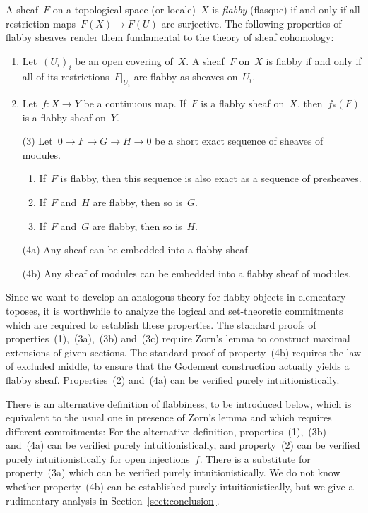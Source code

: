 \documentclass[oneside]{amsart}
\theoremstyle{definition}
\theoremstyle{plain}
\theoremstyle{remark}
\renewcommand{\_}{\mathpunct{.}\,}
\begin{document}
A sheaf~$F$ on a topological space (or locale)~$X$ is \emph{flabby} (flasque) if and only
if all restriction maps~$F(X) \to F(U)$ are surjective. The following
properties of flabby sheaves render them fundamental to the theory of sheaf
cohomology:
\begin{enumerate}
\item Let~$(U_i)_i$ be an open covering of~$X$.
A sheaf~$F$ on~$X$ is flabby if and only if all of its restrictions~$F|_{U_i}$
are flabby as sheaves on~$U_i$.
\item Let~$f : X \to Y$ be a continuous map. If~$F$ is a flabby sheaf on~$X$,
then~$f_*(F)$ is a flabby sheaf on~$Y$.
\item[(3)] Let~$0 \to F \to G \to H \to 0$ be a short exact sequence of sheaves of
modules.
\begin{enumerate}
\item If~$F$ is flabby, then this sequence is also exact as a sequence of
presheaves.
\item If~$F$ and~$H$ are flabby, then so is~$G$.
\item If~$F$ and~$G$ are flabby, then so is~$H$.
\end{enumerate}
\item[(4a)] Any sheaf can be embedded into a flabby sheaf.
\item[(4b)] Any sheaf of modules can be embedded into a flabby sheaf of modules.
\end{enumerate}

Since we want to develop an analogous theory for flabby objects in elementary
toposes, it is worthwhile to analyze the logical and set-theoretic commitments
which are required to establish these properties. The standard proofs of
properties~(1),~(3a),~(3b) and~(3c) require Zorn's lemma to construct maximal
extensions of given sections. The standard proof of property~(4b) requires the
law of excluded middle, to ensure that the Godement construction actually
yields a flabby sheaf. Properties~(2) and~(4a) can be verified purely
intuitionistically.

There is an alternative definition of flabbiness, to be introduced below, which
is equivalent to the usual one in presence of Zorn's lemma and which
requires different commitments: For the alternative definition,
properties~(1),~(3b) and~(4a) can be verified purely intuitionistically, and
property~(2) can be verified purely intuitionistically for open injections~$f$.
There is a substitute for property~(3a) which can be verified purely
intuitionistically. We do not know whether property~(4b) can be established
purely intuitionistically, but we give a rudimentary analysis in
Section~\ref{sect:conclusion}.
\end{document}

